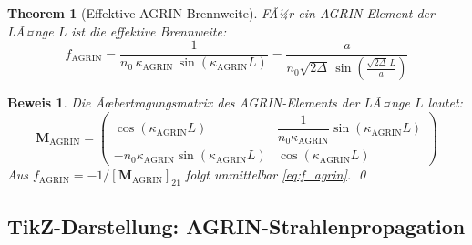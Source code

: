 ﻿\documentclass[12pt,a4paper]{article}
\newtheorem{theorem}{Theorem}[section]
\newtheorem{beweis}{Beweis}
\theoremstyle{definition}
\newcommand{\AGRIN}{\mathrm{AGRIN}}
\begin{document}
	\begin{theorem}[Effektive AGRIN-Brennweite]
		FÃ¼r ein AGRIN-Element der LÃ¤nge $L$ ist die effektive Brennweite:
		\begin{equation}
			\boxed{
				f_\AGRIN = \frac{1}{n_0\,\kappa_\AGRIN\,\sin(\kappa_\AGRIN L)}
				= \frac{a}{n_0\sqrt{2\Delta}\,\sin\!\left(\frac{\sqrt{2\Delta}\,L}{a}\right)}
			}
			\label{eq:f_agrin}
		\end{equation}
	\end{theorem}
	
	\begin{beweis}
		Die Ãœbertragungsmatrix des AGRIN-Elements der LÃ¤nge $L$ lautet:
		\begin{equation}
			\mathbf{M}_\AGRIN = \begin{pmatrix}
				\cos(\kappa_\AGRIN L) &
				\dfrac{1}{n_0\kappa_\AGRIN}\sin(\kappa_\AGRIN L) \\[1em]
				-n_0\kappa_\AGRIN\sin(\kappa_\AGRIN L) &
				\cos(\kappa_\AGRIN L)
			\end{pmatrix}
		\end{equation}
		Aus $f_\AGRIN = -1/[\mathbf{M}_\AGRIN]_{21}$ folgt unmittelbar
		\eqref{eq:f_agrin}. \qed
	\end{beweis}
	
	\subsection{TikZ-Darstellung: AGRIN-Strahlenpropagation}
	
\end{document}

